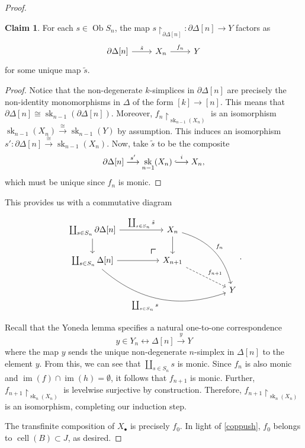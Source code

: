 \documentclass[10pt,letterpaper,cm]{nupset}
\theoremstyle{definition}
\theoremstyle{theorem}
\newtheorem*{claim}{Claim}
\theoremstyle{remark}
\newcommand{\hooklongrightarrow}{\lhook\joinrel\longrightarrow}
\DeclareMathOperator{\im}{im}
\DeclareMathOperator{\ob}{Ob}
\newcommand{\0}{\mathbf{0}}
\newcommand{\1}{\mathbf{1}}
\newcommand{\2}{\mathbf{2}}
\DeclareMathOperator{\sk}{sk}
\DeclareMathOperator{\cell}{cell}
\begin{document}
\begin{proof}
\begin{claim}
For each $s\in \ob{S_n}$, the map $s\restriction_{\partial{\Delta[n]}} : \partial{\Delta[n]} \to Y$ factors as
\[
\begin{tikzcd}
{\partial{\Delta[n]}} \arrow[r, "\tilde{s}"] & X_n \arrow[r, "f_n"] & Y
\end{tikzcd}
\] for some unique map $\tilde{s}$.
\end{claim}
\begin{proof}
 Notice that the non-degenerate $k$-simplices in $\partial{\Delta[n]}$ are precisely the non-identity monomorphisms in $\varDelta$ of the form $\left[k\right] \to \left[n\right]$. This means that  $\partial{\Delta[n]} \cong \sk_{n-1}(\partial{\Delta[n]})$. Moreover, $f_n\restriction_{\sk_{n-1}(X_n)}$ is an isomorphism $\sk_{n-1}(X_n) \overset{\cong}{\longrightarrow} \sk_{n-1}(Y)$ by assumption. This induces an isomorphism $s' : \partial{\Delta[n]} \overset{\cong}{\longrightarrow} \sk_{n-1}(X_n)$. Now, take $\tilde{s}$ to be the composite
\[  
\partial{\Delta[n]} \overset{s'}{\longrightarrow} \sk_{n-1}(X_n)  \overset{i}{\hooklongrightarrow} X_n,
\] which must be unique since $f_n$ is monic.
\end{proof}

This provides us with a commutative diagram

\[
\begin{tikzcd}[column sep=huge]
{\coprod_{s\in S_n}\partial{\Delta[n]}} \arrow[d] \arrow[r, "\coprod_{s\in S_n}\tilde{s}"] 
 \arrow[dr, phantom, "\scalebox{1.5}{\color{black}$\ulcorner$}", very near end, color=black]
 & X_n \arrow[d] \arrow[rdd, "f_n", bend left] &   \\
{\coprod_{s\in S_n}\Delta[n]} \arrow[r] \arrow[rrd, "\coprod_{s\in S_n}{s}"', bend right]         & X_{n+1} \arrow[rd, "f_{n+1}", dashed]       &   \\
                                                                                                  &                                             & Y
\end{tikzcd}.
\]

Recall that the Yoneda lemma specifies a natural one-to-one correspondence 
\[
y\in Y_n \longleftrightarrow \Delta[n] \overset{y}{\to} Y
\] where the map $y$ sends the unique non-degenerate $n$-simplex in $\Delta[n]$ to the element $y$. From this, we can see that $\coprod_{s\in S_n}{s}$ is monic. Since $f_n$ is also monic and $\im(f) \cap \im(h) = \emptyset$, it follows that $f_{n+1}$ is monic. Further, $f_{n+1}\restriction_{\sk_n(X_{n})}$ is levelwise surjective by construction. Therefore, $f_{n+1}\restriction_{\sk_n(X_{n})}$ is an isomorphism, completing our induction step.

\smallskip

The transfinite composition of $X_{\bullet}$ is precisely $f_0$. In light of \cref{coppush}, $f_0$ belongs to $\cell(B) \subset J$, as desired.
\end{proof}
\end{document}
